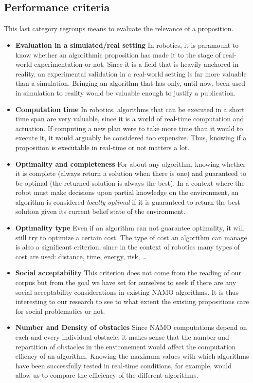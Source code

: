 \subsection{Performance criteria}

\paragraph{} This last category regroups means to evaluate the relevance of a proposition.

\begin{itemize}
  \item \textbf{Evaluation in a simulated/real setting} In robotics, it is paramount to know whether an algorithmic proposition has made it to the stage of real-world experimentation or not. Since it is a field that is heavily anchored in reality, an experimental validation in a real-world setting is far more valuable than a simulation. Bringing an algorithm that has only, until now, been used in simulation to reality would be valuable enough to justify a publication.
  \item \textbf{Computation time} In robotics, algorithms that can be executed in a short time span are very valuable, since it is a world of real-time computation and actuation. If computing a new plan were to take more time than it would to execute it, it would arguably be considered too expensive. Thus, knowing if a proposition is executable in real-time or not matters a lot.
  \item \textbf{Optimality and completeness} For about any algorithm, knowing whether it is complete (always return a solution when there is one) and guaranteed to be optimal (the returned solution is always the best). In a context where the robot must make decisions upon partial knowledge on the environment, an algorithm is considered \textit{locally optimal} if it is guaranteed to return the best solution given its current belief state of the environment.
  \item \textbf{Optimality type} Even if an algorithm can not guarantee optimality, it will still try to optimize a certain cost. The type of cost an algorithm can manage is also a significant criterion, since in the context of robotics many types of cost are used: distance, time, energy, risk, \dots
  \item \textbf{Social acceptability} This criterion does not come from the reading of our corpus but from the goal we have set for ourselves to seek if there are any social acceptability considerations in existing NAMO algorithms. It is thus interesting to our research to see to what extent the existing propositions care for social problematics or not.
  \item \textbf{Number and Density of obstacles} Since NAMO computations depend on each and every individual obstacle, it makes sense that the number and repartition of obstacles in the environement would affect the computation effiency of an algorithm. Knowing the maximum values with which algorithms have been successfully tested in real-time conditions, for example, would allow us to compare the efficiency of the different algorithms.
\end{itemize}


